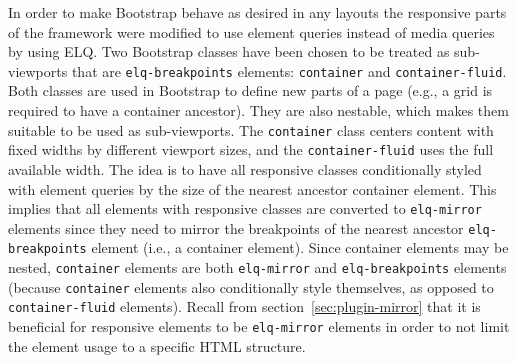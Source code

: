 \documentclass[a4paper,11pt]{kth-mag}
\newcommand{\code}[1]{\texttt{#1}}
\begin{document}

      In order to make \gls{Bootstrap} behave as desired in any layouts the \gls{responsive} parts of the framework were modified to use element queries instead of \gls{media queries} by using \gls{ELQ}.
      Two \gls{Bootstrap} classes have been chosen to be treated as sub-\glspl{viewport} that are \code{elq-breakpoints} \glspl{element}: \code{container} and \code{container-fluid}.
      Both classes are used in \gls{Bootstrap} to define new parts of a page (e.g., a grid is required to have a container ancestor).
      They are also nestable, which makes them suitable to be used as sub-\glspl{viewport}.
      The \code{container} class centers content with fixed widths by different \gls{viewport} sizes, and the \code{container-fluid} uses the full available width.
      The idea is to have all \gls{responsive} classes conditionally styled with element queries by the size of the nearest ancestor container \gls{element}.
      This implies that all \glspl{element} with \gls{responsive} classes are converted to \code{elq-mirror} \glspl{element} since they need to mirror the breakpoints of the nearest ancestor \code{elq-breakpoints} element (i.e., a container \gls{element}).
      Since container \glspl{element} may be nested, \code{container} \glspl{element} are both \code{elq-mirror} and \code{elq-breakpoints} \glspl{element} (because \code{container} \glspl{element} also conditionally style themselves, as opposed to \code{container-fluid} \glspl{element}).
      Recall from section~\ref{sec:plugin-mirror} that it is beneficial for \gls{responsive} \glspl{element} to be \code{elq-mirror} \glspl{element} in order to not limit the element usage to a specific \gls{HTML} structure.
\end{document}
